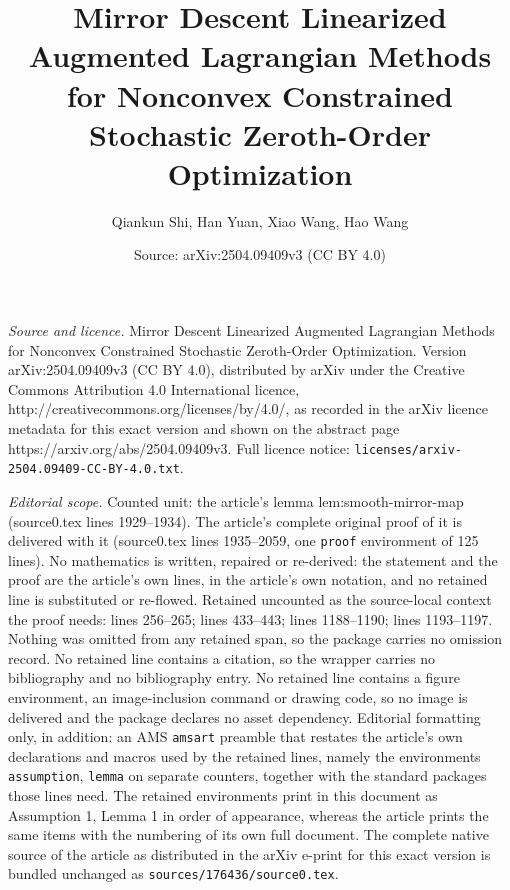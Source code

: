 \documentclass[10pt,a4paper]{amsart}
\title{Mirror Descent Linearized Augmented Lagrangian Methods for Nonconvex Constrained Stochastic Zeroth-Order Optimization}
\author{Qiankun Shi, Han Yuan, Xiao Wang, Hao Wang}
\date{Source: arXiv:2504.09409v3 (CC BY 4.0)}
\begin{document}
\maketitle

\noindent\emph{Source and licence.} Mirror Descent Linearized Augmented Lagrangian Methods for Nonconvex Constrained Stochastic Zeroth-Order Optimization. Version arXiv:2504.09409v3 (CC BY 4.0), distributed by arXiv under the Creative Commons Attribution 4.0 International licence, http://creativecommons.org/licenses/by/4.0/, as recorded in the arXiv licence metadata for this exact version and shown on the abstract page https://arxiv.org/abs/2504.09409v3. Full licence notice: \texttt{licenses/arxiv-2504.09409-CC-BY-4.0.txt}.\par\smallskip

\noindent\textit{Editorial scope.} Counted unit: the article's lemma lem:smooth-mirror-map (source0.tex lines 1929--1934). The article's complete original proof of it is delivered with it (source0.tex lines 1935--2059, one \texttt{proof} environment of 125 lines). No mathematics is written, repaired or re-derived: the statement and the proof are the article's own lines, in the article's own notation, and no retained line is substituted or re-flowed.  Retained uncounted as the source-local context the proof needs: lines 256--265; lines 433--443; lines 1188--1190; lines 1193--1197.  Nothing was omitted from any retained span, so the package carries no omission record.  No retained line contains a citation, so the wrapper carries no bibliography and no bibliography entry.  No retained line contains a figure environment, an image-inclusion command or drawing code, so no image is delivered and the package declares no asset dependency.  Editorial formatting only, in addition: an AMS \texttt{amsart} preamble that restates the article's own declarations and macros used by the retained lines, namely the environments \texttt{assumption}, \texttt{lemma} on separate counters, together with the standard packages those lines need.  The retained environments print in this document as Assumption 1, Lemma 1 in order of appearance, whereas the article prints the same items with the numbering of its own full document.  The complete native source of the article as distributed in the arXiv e-print for this exact version is bundled unchanged as \texttt{sources/176436/source0.tex}.
\end{document}
